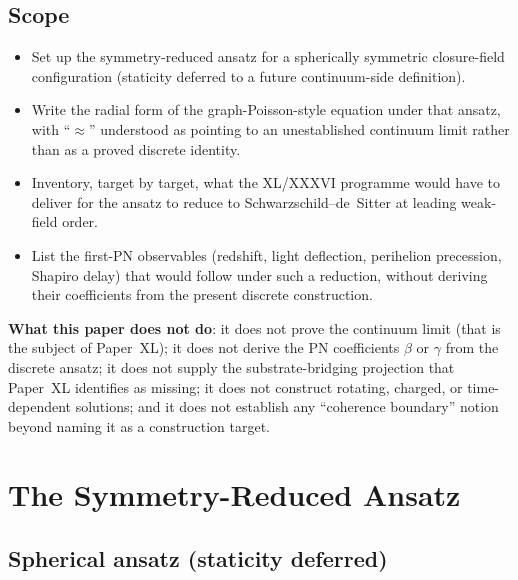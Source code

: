 \documentclass[12pt]{article}
\theoremstyle{definition}
\theoremstyle{remark}
\begin{document}
\subsection{Scope}
\begin{itemize}
\item Set up the symmetry-reduced ansatz for a spherically symmetric closure-field configuration (staticity deferred to a future continuum-side definition).
\item Write the radial form of the graph-Poisson-style equation under that ansatz, with ``$\approx$'' understood as pointing to an unestablished continuum limit rather than as a proved discrete identity.
\item Inventory, target by target, what the XL/XXXVI programme would have to deliver for the ansatz to reduce to Schwarzschild--de~Sitter at leading weak-field order.
\item List the first-PN observables (redshift, light deflection, perihelion precession, Shapiro delay) that would follow under such a reduction, without deriving their coefficients from the present discrete construction.
\end{itemize}
\textbf{What this paper does not do}: it does not prove the continuum limit (that is the subject of Paper~XL); it does not derive the PN coefficients $\beta$ or $\gamma$ from the discrete ansatz; it does not supply the substrate-bridging projection that Paper~XL identifies as missing; it does not construct rotating, charged, or time-dependent solutions; and it does not establish any ``coherence boundary'' notion beyond naming it as a construction target.

\section{The Symmetry-Reduced Ansatz}\label{sec:ansatz}

\subsection{Spherical ansatz (staticity deferred)}
\end{document}
